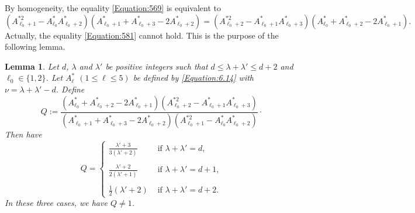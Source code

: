 \documentclass[10pt]{article}
\newtheorem{lemma}[theorem]{Lemma}
\theoremstyle{definition}
\numberwithin{equation}{section}
\begin{document}
By homogeneity, the equality \eqref{Equation:569} is equivalent to 
\begin{equation}\label{Equation:581}
(A_{\ell_0+1}^{*2} -A_{\ell_0}^* A_{\ell_0+2}^*)(A_{\ell_0 +1}^* +A_{\ell_0 +3}^* -2 A_{\ell_0 +2}^*) = (A_{\ell_0+2}^{*2} -A_{\ell_0+1} ^*A_{\ell_0+3}^*) 
(A_{\ell_0 }^* +A_{\ell_0 +2}^* -2 A_{\ell_0 +1}^*). 
\end{equation}
Actually, the equality \eqref{Equation:581} cannot hold. This is the purpose of the following lemma.

\begin{lemma} \label{Lemma:quotientQ} 
 Let $d$, $\lambda$ and $\lambda'$ be positive integers such that $d\leqslant \lambda +\lambda' \leqslant d+2$ and $\ell_0\in \{1,2\}$. Let $A_\ell^*$ $(1\leqslant \ell\leqslant 5)$ be defined by \eqref{Equation:6.14} with $\nu=\lambda+\lambda'-d$. Define
\begin{equation}\label{Equation:617}
Q:=\frac{
(A^*_{\ell_0}+A^*_{\ell_0+2}-2A^*_{\ell_0+1}) ( A_{\ell_0+2}^{*2}-A^*_{\ell_0+1}A^*_{\ell_0+3})}
{(A^*_{\ell_0+1}+A^*_{\ell_0+3}-2A^*_{\ell_0+2})( A_{\ell_0+1}^{*2}-A^*_{\ell_0}A^*_{\ell_0+2})}\cdotp 
\end{equation}
Then have 
\[ 
Q =
 \begin{cases} 
\displaystyle{ \frac{\lambda' +3}{3(\lambda' +2)}}&\text{ if } \lambda +\lambda' =d,\\
\\
 \displaystyle{\frac{ \lambda' +2}{2(\lambda' +1)}}&\text{ if } \lambda +\lambda' =d+1,\\
 \\
\displaystyle{\frac 12(\lambda'+2)} &\text{ if } \lambda +\lambda' =d+2.
 \end{cases}
\]
In these three cases, we have $Q \neq 1$.
\end{lemma}
\end{document}
